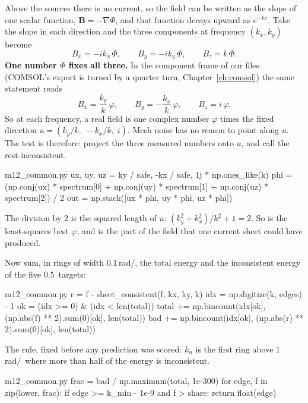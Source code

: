 Above the sources there is no current, so the field can be written as the slope of one scalar function,
$\mathbf{B}=-\nabla\Phi$, and that function decays upward as $e^{-kz}$. Take the slope in each direction and the three
components at frequency $(k_x,k_y)$ become
\[
B_x=-i k_x\,\Phi,\qquad B_y=-i k_y\,\Phi,\qquad B_z=k\,\Phi .
\]
\textbf{One number $\Phi$ fixes all three.} In the component frame of our files (COMSOL's export is turned by a quarter
turn, Chapter~\ref{ch:comsol}) the same statement reads
\[
B_x=\frac{k_y}{k}\,\varphi,\qquad B_y=-\frac{k_x}{k}\,\varphi,\qquad B_z=i\,\varphi .
\]
So at each frequency, a real field is one complex number $\varphi$ times the fixed direction
$u=(k_y/k,\;-k_x/k,\;i)$. Mesh noise has no reason to point along $u$. The test is therefore: project the three measured
numbers onto $u$, and call the rest inconsistent.

\begin{code*}{m12_common.py}
    ux, uy, uz = ky / safe, -kx / safe, 1j * np.ones_like(k)
    phi = (np.conj(ux) * spectrum[0] + np.conj(uy) * spectrum[1] + np.conj(uz) * spectrum[2]) / 2
    out = np.stack([ux * phi, uy * phi, uz * phi])
\end{code*}

The division by 2 is the squared length of $u$: $(k_y^2+k_x^2)/k^2+1=2$. So  is the least-squares best
$\varphi$, and  is the part of the field that one current sheet could have produced.

Now sum, in rings of width 0.1\,rad/\um, the total energy and the inconsistent energy of the five 0.5\um\ targets:

\begin{code*}{m12_common.py}
        r = f - sheet_consistent(f, kx, ky, k)
        idx = np.digitize(k, edges) - 1
        ok = (idx >= 0) & (idx < len(total))
        total += np.bincount(idx[ok], (np.abs(f) ** 2).sum(0)[ok], len(total))
        bad += np.bincount(idx[ok], (np.abs(r) ** 2).sum(0)[ok], len(total))
\end{code*}

The rule, fixed before any prediction was scored: $k_n$ is the first ring above 1\,rad/\um\ where more than half of the
energy is inconsistent.

\begin{code*}{m12_common.py}
    frac = bad / np.maximum(total, 1e-300)
    for edge, f in zip(lower, frac):
        if edge >= k_min - 1e-9 and f > share:
            return float(edge)
\end{code*}

